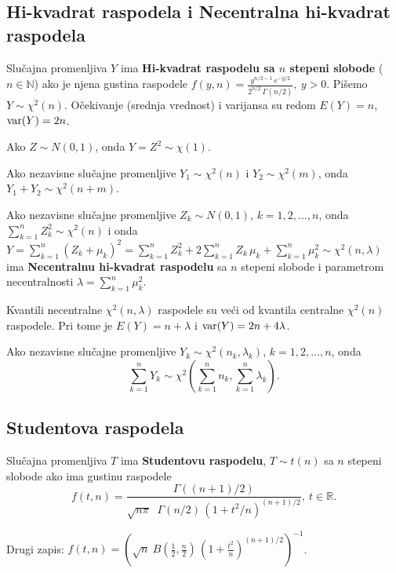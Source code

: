 \documentclass[twoside,titlepage,12pt,a4paper]{book}
\def\R{\mathbb{R}}
\def\N{\mathbb{N}}
\def\var{\mathop{\rm var}\nolimits}
\numberwithin{equation}{chapter}
\begin{document}
\subsection{Hi-kvadrat raspodela i Necentralna hi-kvadrat raspodela}

Slučajna promenljiva $Y$ ima \textbf{Hi-kvadrat raspodelu sa $n$ stepeni
slobode} ($n \in \N$) ako je njena gustina raspodele
\(\displaystyle 
f ( y, n ) =
\frac{y^{n/2-1} \, e^{-y/2}}{2^{n/2} \, \Gamma (n / 2)},\: y > 0
\).
Pišemo \(Y \sim \chi^2 ( n ) \).
Očekivanje (srednja vrednost) i varijansa su redom
$E ( Y ) = n$, $\var ( Y ) = 2 n$.

Ako $Z \sim N ( 0, 1 )$, onda $Y = Z^2 \sim \chi ( 1 )$.

Ako nezavisne slučajne promenljive
$Y_1 \sim \chi^2 ( n )$ i $Y_2 \sim \chi^2 ( m )$, onda
$Y_1 + Y_2 \sim \chi^2 ( n + m )$.

Ako nezavisne slučajne promenljive 
$Z_k \sim N ( 0, 1 )$, $k = 1, 2, \ldots, n$, onda
$\displaystyle \sum_{k = 1}^n Z_k^2 \sim \chi^2 ( n )$ i onda
$\displaystyle Y = \sum_{k = 1}^n ( Z_k + \mu_k )^2 = \sum_{k = 1}^n Z_k^2 + 2 \sum_{k = 1}^n Z_k \, \mu_k + \sum_{k = 1}^n \mu_k^2 \sim \chi^2 ( n, \lambda )$ ima \textbf{Necentralnu hi-kvadrat raspodelu} sa $n$ stepeni slobode i parametrom necentralnosti $\lambda = \sum_{k = 1}^n \mu_k^2$.

Kvantili necentralne $\chi^2 ( n, \lambda )$ raspodele su veći od kvantila centralne $\chi^2 ( n )$ raspodele. Pri tome je $E ( Y ) = n + \lambda$ i $\var ( Y ) = 2 n + 4 \lambda$.

Ako nezavisne slučajne promenljive 
$Y_k \sim \chi^2 ( n_k, \lambda_k )$, $k = 1, 2, \ldots, n$, onda
$$\sum_{k = 1}^n Y_k \sim 
\chi^2 \left( \sum_{k = 1}^n n_k, \sum_{k = 1}^n \lambda_k \right).$$ 

\subsection{Studentova raspodela}

Slučajna promenljiva $T$ ima \textbf{Studentovu raspodelu}, \(\displaystyle T \sim t ( n )\) sa $n$ stepeni slobode ako ima gustinu raspodele
\[\displaystyle f ( t, n ) =
\frac{\Gamma ( (n+1) / 2)}{\sqrt{n \pi} \;\; \Gamma ( n/2 ) \, 
\left( 1 + t^2 / n \right)^{(n+1)/2}}, \: t \in \R.\]

Drugi zapis: $\displaystyle
f ( t, n ) = \left( \sqrt{n} \: B \left( \frac12, \frac{n}{2} \right) \,
\left( 1 + \frac{t^2}{n} \right)^{(n+1)/2} \right)^{-1}$.
\end{document}
